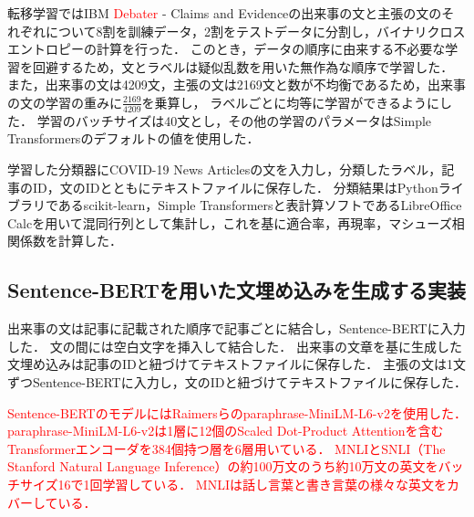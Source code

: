 \documentclass[12pt,a4j]{jreport}
\begin{document}
転移学習ではIBM \textcolor{red}{Debater} - Claims and Evidenceの出来事の文と主張の文のそれぞれについて8割を訓練データ，2割をテストデータに分割し，バイナリクロスエントロピーの計算を行った．
このとき，データの順序に由来する不必要な学習を回避するため，文とラベルは疑似乱数を用いた無作為な順序で学習した\cite{aurellen20}．
また，出来事の文は4209文，主張の文は2169文と数が不均衡であるため，出来事の文の学習の重みに$\frac{2169}{4209}$を乗算し，
ラベルごとに均等に学習ができるようにした．
学習のバッチサイズは40文とし，その他の学習のパラメータはSimple Transformersのデフォルトの値を使用した．


学習した分類器にCOVID-19 News Articlesの文を入力し，分類したラベル，記事のID，文のIDとともにテキストファイルに保存した．
分類結果はPythonライブラリであるscikit-learn，Simple Transformersと表計算ソフトであるLibreOffice Calcを用いて混同行列として集計し，これを基に適合率，再現率，マシューズ相関係数を計算した．

\subsection{Sentence-BERTを用いた文埋め込みを生成する実装}
出来事の文は記事に記載された順序で記事ごとに結合し，Sentence-BERTに入力した．
文の間には空白文字を挿入して結合した．
出来事の文章を基に生成した文埋め込みは記事のIDと紐づけてテキストファイルに保存した．
主張の文は1文ずつSentence-BERTに入力し，文のIDと紐づけてテキストファイルに保存した．


\textcolor{red}{
Sentence-BERTのモデルにはRaimersらのparaphrase-MiniLM-L6-v2を使用した\cite{reimers_sentence-bert_2019}．
paraphrase-MiniLM-L6-v2は1層に12個のScaled Dot-Product Attentionを含むTransformerエンコーダを384個持つ層を6層用いている．
MNLIとSNLI（The Stanford Natural Language Inference）の約100万文のうち約10万文の英文をバッチサイズ16で1回学習している．
MNLIは話し言葉と書き言葉の様々な英文をカバーしている．
}
\end{document}

